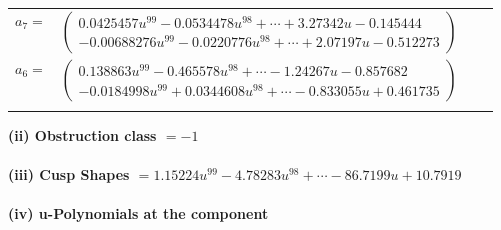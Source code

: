 \documentclass[1p]{elsarticle_modified}
\theoremstyle{definition}
\begin{document}
\begin{tabular}{m{7pt} m{180pt} m{7pt} m{180pt} }
\flushright $a_{7}=$&$\begin{pmatrix}0.0425457 u^{99}-0.0534478 u^{98}+\cdots+3.27342 u-0.145444\\-0.00688276 u^{99}-0.0220776 u^{98}+\cdots+2.07197 u-0.512273\end{pmatrix}$ \\
\flushright $a_{6}=$&$\begin{pmatrix}0.138863 u^{99}-0.465578 u^{98}+\cdots-1.24267 u-0.857682\\-0.0184998 u^{99}+0.0344608 u^{98}+\cdots-0.833055 u+0.461735\end{pmatrix}$\\&\end{tabular}
\flushleft \textbf{(ii) Obstruction class $= -1$}\\~\\
\flushleft \textbf{(iii) Cusp Shapes $= 1.15224 u^{99}-4.78283 u^{98}+\cdots-86.7199 u+10.7919$}\\~\\
\newpage\renewcommand{\arraystretch}{1}
\flushleft \textbf{(iv) u-Polynomials at the component}\newline \\
\end{document}
